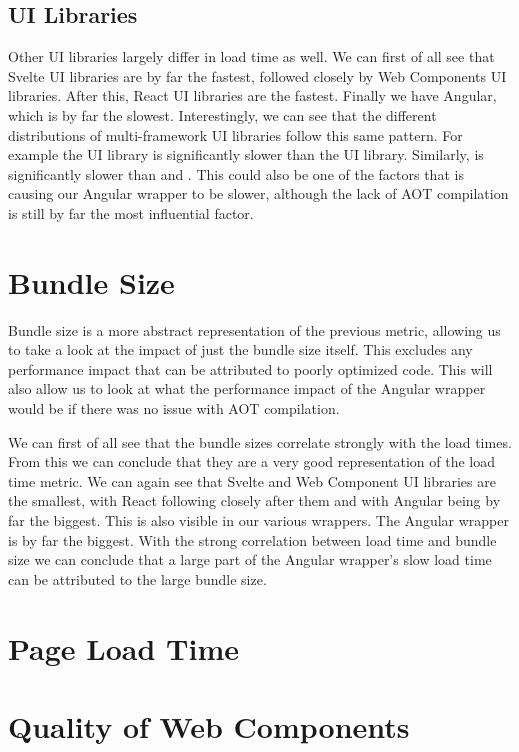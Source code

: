 \subsection{UI Libraries}
Other UI libraries largely differ in load time as well. We can first of all see that Svelte UI libraries are by far the fastest, followed closely by Web Components UI libraries. After this, React UI libraries are the fastest. Finally we have Angular, which is by far the slowest. Interestingly, we can see that the different distributions of multi-framework UI libraries follow this same pattern. For example the  UI library is significantly slower than the  UI library. Similarly,  is significantly slower than  and . This could also be one of the factors that is causing our Angular wrapper to be slower, although the lack of AOT compilation is still by far the most influential factor.

\section{Bundle Size}
Bundle size is a more abstract representation of the previous metric, allowing us to take a look at the impact of just the bundle size itself. This excludes any performance impact that can be attributed to poorly optimized code. This will also allow us to look at what the performance impact of the Angular wrapper would be if there was no issue with AOT compilation.

We can first of all see that the bundle sizes correlate strongly with the load times. From this we can conclude that they are a very good representation of the load time metric. We can again see that Svelte and Web Component UI libraries are the smallest, with React following closely after them and with Angular being by far the biggest. This is also visible in our various wrappers. The Angular wrapper is by far the biggest. With the strong correlation between load time and bundle size we can conclude that a large part of the Angular wrapper's slow load time can be attributed to the large bundle size.

\section{Page Load Time}


\section{Quality of Web Components}
